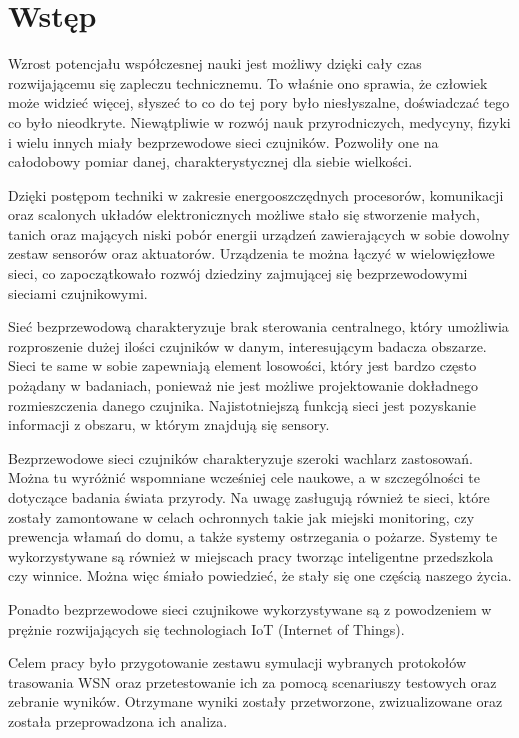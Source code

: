 \chapter{Wstęp}
Wzrost potencjału współczesnej nauki jest możliwy dzięki cały czas rozwijającemu się zapleczu technicznemu. To właśnie ono sprawia, że człowiek może widzieć więcej, słyszeć to co do tej pory było niesłyszalne, doświadczać tego co było nieodkryte. Niewątpliwie w rozwój nauk przyrodniczych, medycyny, fizyki i wielu innych miały bezprzewodowe sieci czujników. Pozwoliły one na całodobowy pomiar danej, charakterystycznej dla siebie wielkości.

Dzięki postępom techniki w zakresie energooszczędnych procesorów, komunikacji oraz scalonych układów elektronicznych możliwe stało się stworzenie małych, tanich oraz mających niski pobór energii urządzeń zawierających w sobie dowolny zestaw sensorów oraz aktuatorów. Urządzenia te można łączyć w wielowięzłowe sieci, co zapoczątkowało rozwój dziedziny zajmującej się bezprzewodowymi sieciami czujnikowymi. 

Sieć bezprzewodową charakteryzuje brak sterowania centralnego, który umożliwia rozproszenie dużej ilości czujników w danym, interesującym badacza obszarze. Sieci te same w sobie zapewniają element losowości, który jest bardzo często pożądany w badaniach, ponieważ nie jest możliwe projektowanie dokładnego rozmieszczenia danego czujnika. Najistotniejszą funkcją sieci jest pozyskanie informacji z obszaru, w którym znajdują się sensory.

Bezprzewodowe sieci czujników charakteryzuje szeroki wachlarz zastosowań. Można tu wyróżnić wspomniane wcześniej cele naukowe, a w szczególności te dotyczące badania świata przyrody. Na uwagę zasługują również te sieci, które zostały zamontowane w celach ochronnych takie jak miejski monitoring, czy prewencja włamań do domu, a także systemy ostrzegania o pożarze. Systemy te wykorzystywane są również w miejscach pracy tworząc inteligentne przedszkola czy winnice. Można więc śmiało powiedzieć, że
stały się one częścią naszego życia.

Ponadto bezprzewodowe sieci czujnikowe wykorzystywane są z powodzeniem w prężnie rozwijających się technologiach IoT (Internet of Things). 

Celem pracy było przygotowanie zestawu symulacji wybranych protokołów trasowania WSN oraz przetestowanie ich za pomocą scenariuszy testowych oraz zebranie wyników. Otrzymane wyniki zostały przetworzone, zwizualizowane oraz została przeprowadzona ich analiza.
